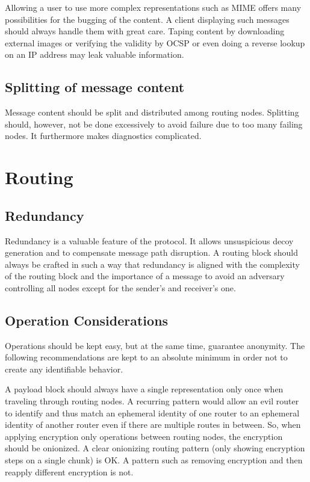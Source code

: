 Allowing a user to use more complex representations such as MIME offers many possibilities for the bugging of the content. A client displaying such messages should always handle them with great care. Taping content by downloading external images or verifying the validity by OCSP or even doing a reverse lookup on an IP address may leak valuable information.

\subsection{Splitting of message content}
Message content should be split and distributed among routing nodes. Splitting should, however, not be done excessively to avoid failure due to too many failing nodes. It furthermore makes diagnostics complicated. 

\section{Routing}
\subsection{Redundancy}
Redundancy is a valuable feature of the protocol. It allows unsuspicious decoy generation and to compensate message path disruption. A routing block should always be crafted in such a way that redundancy is aligned with the complexity of the routing block and the importance of a message to avoid an adversary controlling all nodes except for the sender's and receiver's one.

\subsection{Operation Considerations}
Operations should be kept easy, but at the same time, guarantee anonymity. The following recommendations are kept to an absolute minimum in order not to create any identifiable behavior.

A payload block should always have a single representation only once when traveling through routing nodes. A recurring pattern would allow an evil router to identify and thus match an ephemeral identity of one router to an ephemeral identity of another router even if there are multiple routes in between. So, when applying encryption only operations between routing nodes, the encryption should be onionized. A clear onionizing routing pattern (only showing encryption steps on a single chunk) is OK. A pattern such as removing encryption and then reapply different encryption is not.

